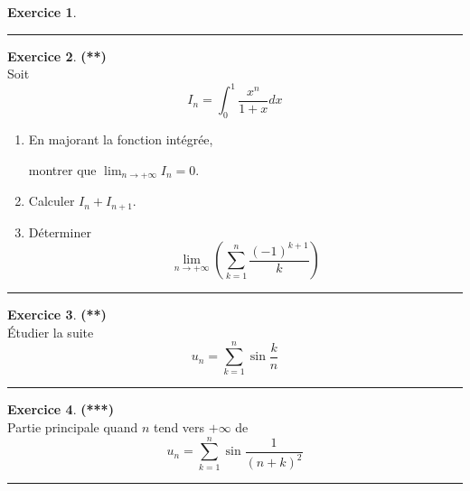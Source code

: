 \documentclass[a4paper,11pt]{article}
\theoremstyle{definition}
\newtheorem{exo}{Exercice} %
\begin{document}
\begin{minipage}{1\linewidth}
\begin{minipage}[t]{0.48\linewidth}
\begin{exo}
\centering\rule{1\linewidth}{0.6pt}\end{exo}

		
		
		
\end{minipage}\hfill\vrule\hfill\begin{minipage}[t]{0.48\linewidth}\raggedright

\begin{exo}\textbf{(**)}\quad\\[0.2cm]
Soit $$\displaystyle I_{n} = \int_0^1 \frac{x^n}{1 + x}d x$$
\begin{enumerate}
	\item En majorant la fonction int\'egr\'ee, 
	
	montrer que $\displaystyle \lim_{n\to +\infty} I_{n}=0$.
	\item  Calculer $\displaystyle I_n + I_{n + 1}$.
	\item D\'eterminer $$\displaystyle \lim_{n \rightarrow  + \infty} \left(\sum_{k = 1}^n \frac{(-1)^{k + 1}}k\right)$$
\end{enumerate}	
	
	\centering\rule{1\linewidth}{0.6pt}\end{exo}


\begin{exo}\textbf{(**)}\quad\\[0.2cm]
	Étudier la suite $$u_n = \sum_{k=1}^{n}\sin\frac{k}{n}$$
	
\centering\rule{1\linewidth}{0.6pt}\end{exo}


\begin{exo}\textbf{(***)}\quad\\[0.2cm]
	Partie principale quand $n$ tend vers $+\infty$ de $$u_n=\sum_{k=1}^{n}\sin\frac{1}{(n+k)^2}$$
	
	\centering\rule{1\linewidth}{0.6pt}\end{exo}		
		
\end{minipage}\end{minipage} 
\end{document}
